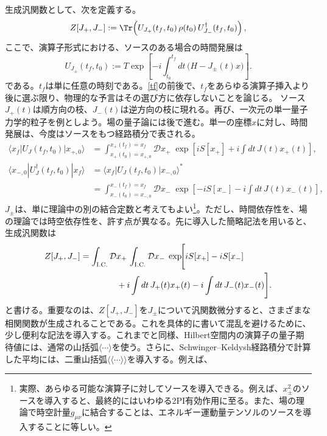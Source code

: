 \documentclass[a4paper,11pt,oneside]{article}
\theoremstyle{definition}
\numberwithin{equation}{section}
\begin{document}
生成汎関数として、次を定義する。
\begin{equation}\label{Zpmop}
Z[J_+,J_-]
:=
\Tr\!\left(
U_{J_+}(t_f,t_0)\,\rho(t_0)\,U_{J_-}^\dagger(t_f,t_0)
\right) ,
\end{equation}
ここで、演算子形式における、ソースのある場合の時間発展は
\begin{equation}
U_{J_\pm}(t_f,t_0)
:=
T\exp\!\left[
-i\int_{t_0}^{t_f} dt\,\bigl(H-J_\pm(t)x\bigr)
\right] .
\end{equation}
である。$ t_{f}$は単に任意の時刻である。\eqref{tf}の前後で、$t_{f} $をあらゆる演算子挿入より後に選ぶ限り、物理的な予言はその選び方に依存しないことを論じる。
ソース$J_+(t)$は順方向の枝、$J_-(t)$は逆方向の枝に現れる。再び、一次元の単一量子力学的粒子を例としよう。場の量子論には後で進む。単一の座標$x$に対し、時間発展は、今度はソースをもつ経路積分で表される。
\begin{align} 
\langle x_f|U_J(t_f,t_0)|x_{+,0}\rangle
&=
\int_{x_{+}(t_0)=x_{+,0}}^{x_{+}(t_f)=x_f}\!\!\!\!\!\!\!\!\!\!\!\!\!\! \mathcal D x_{+}\;
\exp\!\left[
iS[x_{+}] + i\int dt\,J(t)x_{+}(t)
\right] , \\
\langle x_{-,0}|U_J^{\dagger}(t_f,t_0)|x_f\rangle
&=\langle x_{f}|U_J(t_f,t_0)|x_{-,0}\rangle^{\ast} \\
&=
\int_{x_{-}(t_0)=x_{-,0}}^{x_{-}(t_f)=x_f}\!\!\!\!\!\!\!\!\!\!\!\!\!\! \mathcal D x_{-}\;
\exp\!\left[
-iS[x_{-}] - i\int dt\,J(t)x_{-}(t)
\right] ,
\end{align}
$J_{\pm} $は、単に理論中の別の結合定数と考えてもよい\footnote{実際、あらゆる可能な演算子に対してソースを導入できる。例えば、$ x_{\pm}^{2}$のソースを導入すると、最終的にはいわゆる2PI有効作用に至る。また、場の理論で時空計量$ g_{\mu\nu}$に結合することは、エネルギー運動量テンソルのソースを導入することに等しい。}。ただし、時間依存性を、場の理論では時空依存性を、許す点が異なる。先に導入した簡略記法を用いると、生成汎関数は
\begin{align}
Z[J_+,J_-]
&=
\int_{\rm I.C.}\mathcal D x_+\,
\int_{\rm I.C.}\mathcal D x_-\;
\exp\!\Biggl[
iS[x_+] - iS[x_-]
\nonumber\\
&\hspace{1.5cm}
+ i\int dt\,J_+(t)x_+(t)
- i\int dt\,J_-(t)x_-(t)
\Biggr] .
\end{align}
と書ける。重要なのは、$Z[J_+,J_-]$を$ J_{\pm}$について汎関数微分すると、さまざまな相関関数が生成されることである。これを具体的に書いて混乱を避けるために、少し便利な記法を導入する。これまでと同様、Hilbert空間内の演算子の量子期待値には、通常の山括弧$\langle\cdots\rangle$を使う。さらに、Schwinger--Keldysh経路積分で計算した平均には、二重山括弧$\langle\!\langle\cdots\rangle\!\rangle$を導入する。例えば、
\end{document}
